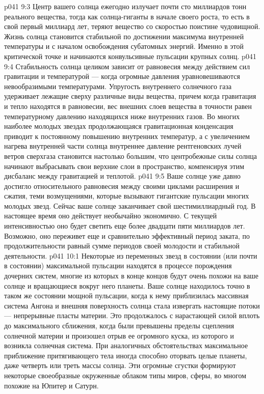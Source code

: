 \vs p041 9:3 \pc Центр вашего солнца ежегодно излучает почти сто миллиардов тонн реального вещества, тогда как солнца\hyp{}гиганты в начале своего роста, то есть в свой первый миллиард лет, теряют вещество со скоростью поистине чудовищной. Жизнь солнца становится стабильной по достижении максимума внутренней температуры и с началом освобождения субатомных энергий. Именно в этой критической точке и начинаются конвульсивные пульсации крупных солнц.
\vs p041 9:4 Стабильность солнца целиком зависит от равновесия между действием сил гравитации и температурой --- когда огромные давления уравновешиваются невообразимыми температурами. Упругость внутреннего солнечного газа удерживает лежащие сверху различные виды вещества, причем когда гравитация и тепло находятся в равновесии, вес внешних слоев вещества в точности равен температурному давлению находящихся ниже внутренних газов. Во многих наиболее молодых звездах продолжающаяся гравитационная конденсация приводит к постоянному повышению внутренних температур, а с увеличением нагрева внутренней части солнца внутреннее давление рентгеновских лучей ветров сверхгаза становится настолько большим, что центробежные силы солнца начинают выбрасывать свои верхние слои в пространство, компенсируя этим дисбаланс между гравитацией и теплотой.
\vs p041 9:5 Ваше солнце уже давно достигло относительного равновесия между своими циклами расширения и сжатия, теми возмущениями, которые вызывают гигантские пульсации многих молодых звезд. Сейчас ваше солнце заканчивает свой шестимиллиардный год. В настоящее время оно действует необычайно экономично. С текущей интенсивностью оно будет светить еще более двадцати пяти миллиардов лет. Возможно, оно переживет еще и сравнительно эффективный период заката, по продолжительности равный сумме периодов своей молодости и стабильной деятельности.
\vs p041 10:1 Некоторые из переменных звезд в состоянии (или почти в состоянии) максимальной пульсации находятся в процессе порождения дочерних систем, многие из которых в конце концов будут очень похожи на ваше солнце и вращающиеся вокруг него планеты. Ваше солнце находилось точно в таком же состоянии мощной пульсации, когда к нему приблизилась массивная система Ангона и внешняя поверхность солнца стала извергать настоящие потоки --- непрерывные пласты материи. Это продолжалось с нарастающей силой вплоть до максимального сближения, когда были превышены пределы сцепления солнечной материи и произошел отрыв ее огромного куска, из которого и возникла солнечная система. При аналогичных обстоятельствах максимальное приближение притягивающего тела иногда способно оторвать целые планеты, даже четверть или треть массы солнца. Эти огромные сгустки формируют некоторые своеобразные окруженные облаком типы миров, сферы, во многом похожие на Юпитер и Сатурн.
